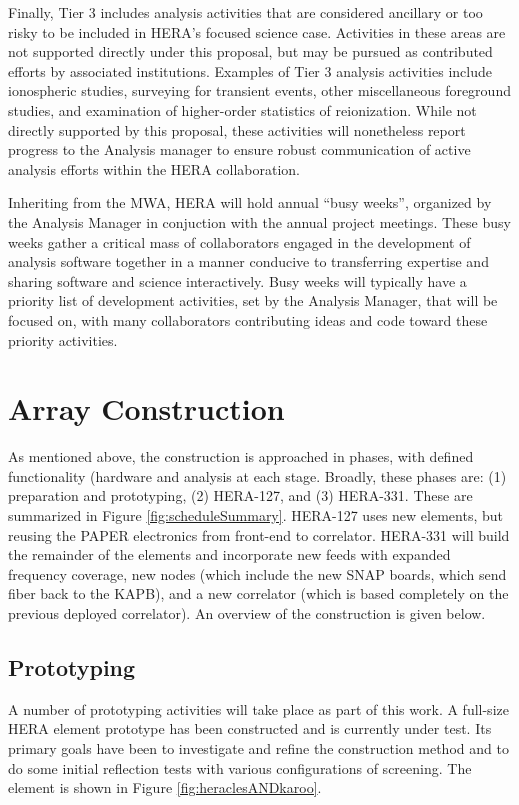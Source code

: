 \documentclass[preprint]{aastex}
\begin{document}
Finally, Tier 3 includes analysis activities that are considered ancillary or too risky to
be included in HERA's focused science case.
Activities in these areas are not supported directly under this proposal, but may be pursued as
contributed efforts by associated institutions.  Examples of Tier 3 analysis activities include
ionospheric studies, surveying for transient events, other miscellaneous foreground studies, and
examination of higher-order statistics of reionization.  While not directly supported by this proposal,
these activities will nonetheless report progress to the Analysis manager to ensure
robust communication of active analysis efforts within the HERA collaboration.

Inheriting from the MWA, HERA will hold annual ``busy weeks'', organized by the Analysis Manager in
conjuction with the annual project meetings.  These busy weeks gather a critical
mass of collaborators engaged in the development of analysis software together in a manner conducive to
transferring expertise and sharing software and science interactively.  Busy weeks will typically
have a priority list of development activities, set by the Analysis Manager, that will be 
focused on, with many collaborators contributing
ideas and code toward these priority activities.


\section{Array Construction}
\label{sec:construction}
As mentioned above, the construction is approached in phases, with defined functionality (hardware 
and analysis at each stage.  Broadly, these phases are:  (1) preparation and prototyping, (2) HERA-127, 
and (3) HERA-331.  These are summarized in Figure \ref{fig:scheduleSummary}.   HERA-127 uses new
elements, but reusing the PAPER electronics from front-end to correlator.  HERA-331 will build the 
remainder of the elements and incorporate new feeds with expanded frequency coverage, new nodes
(which include the new SNAP boards, which send fiber back to the KAPB), and a new correlator (which
is based completely on the previous deployed correlator).
An overview of the construction is given below.

\subsection{Prototyping}
A number of prototyping activities will take place as part of this work.  A full-size HERA element prototype has been
constructed and is currently under test.  Its primary goals have been to investigate and refine the construction
method and to do some initial reflection tests with various configurations of screening.  The element is shown in
Figure \ref{fig:heraclesANDkaroo}.
\end{document}
